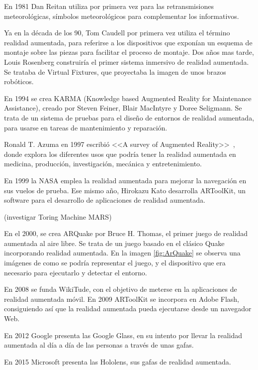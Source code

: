 En 1981 Dan Reitan utiliza por primera vez para las retransmisiones meteorológicas, símbolos meteorológicos para complementar los informativos.

Ya en la década de los 90, Tom Caudell por primera vez utiliza el término realidad aumentada, para referirse a los dispositivos que exponían un esquema de montaje sobre las piezas para facilitar el proceso de montaje. 
Dos años mas tarde, Louis Rosenberg construiría el primer sistema inmersivo de realidad aumentada.  Se trataba de Virtual Fixtures, que proyectaba la imagen de unos brazos robóticos.

En 1994 se crea KARMA (Knowledge based Augmented Reality for Maintenance Assistance), creado por  Steven Feiner, Blair MacIntyre y Doree Seligmann. Se trata de un sistema de pruebas para el diseño de entornos de realidad aumentada, para usarse en tareas de mantenimiento y reparación.

Ronald T. Azuma  en 1997 escribió <<A survey of Augmented Reality>>~\cite{azuma1997survey}, donde explora los diferentes usos que podría tener la realidad aumentada en medicina, producción, investigación, mecánica y entretenimiento.

En 1999 la NASA emplea la realidad aumentada para mejorar la navegación en sus vuelos de prueba. Ese mismo año, Hirokazu Kato desarrolla ARToolKit, un software para el desarrollo de aplicaciones de realidad aumentada.

(investigar Toring Machine MARS)

En el 2000, se crea ARQuake por Bruce H. Thomas, el primer juego de realidad aumentada al aire libre. Se trata de un juego basado en el clásico Quake incorporando realidad aumentada. En la imagen \ref{fig:ArQuake} se observa una imágenes de como se podría representar el juego, y el dispositivo que era necesario para ejecutarlo y detectar el entorno.


En 2008 se funda WikiTude, con el objetivo de meterse en la aplicaciones de realidad aumentada móvil. 
En 2009 ARToolKit se incorpora en Adobe Flash, consiguiendo así que la realidad aumentada pueda ejecutarse desde un navegador Web.

En 2012 Google presenta las Google Glass, en su intento por llevar la realidad aumentada al día a día de las personas a través de unas gafas.  

En 2015 Microsoft presenta las Hololens, sus gafas de realidad aumentada.




